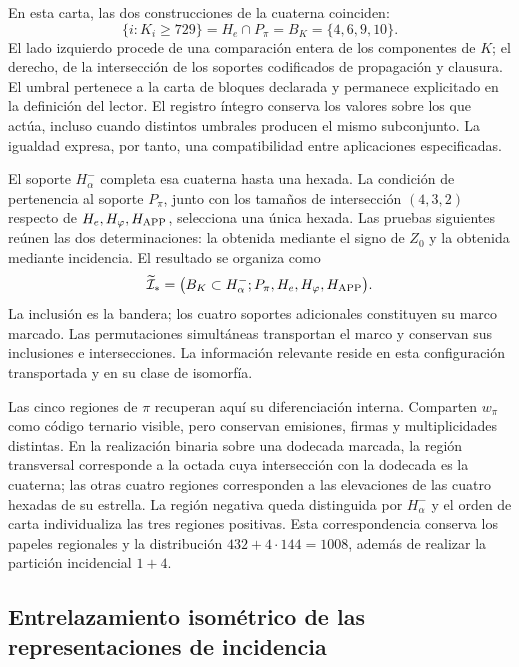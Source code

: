 En esta carta, las dos construcciones de la cuaterna coinciden:
\begin{equation}
 \{i:K_i\geq729\}
 =H_e\cap P_\pi=B_K=\{4,6,9,10\}.
 \label{x_reciprocidad:inc-ampl-cuaterna}
\end{equation}
El lado izquierdo procede de una comparación entera de los componentes
de $K$; el derecho, de la intersección de los soportes codificados de
propagación y clausura. El umbral pertenece a la carta de bloques
declarada y permanece explicitado en la definición del lector. El
registro íntegro conserva los valores sobre los que actúa, incluso cuando
distintos umbrales producen el mismo subconjunto. La igualdad expresa,
por tanto, una compatibilidad entre aplicaciones especificadas.

El soporte $H^-_\alpha$ completa esa cuaterna hasta una hexada. La
condición de pertenencia al soporte $P_\pi$, junto con los tamaños de
intersección $(4,3,2)$ respecto de $H_e,H_\varphi,H_{\rm APP}$,
selecciona una única hexada. Las pruebas siguientes reúnen las dos
determinaciones: la obtenida mediante el signo de $Z_0$ y la obtenida
mediante incidencia. El resultado se organiza como
\begin{equation}
 \widetilde{\mathcal I}_*
 =\bigl(B_K\subset H^-_\alpha;
         P_\pi,H_e,H_\varphi,H_{\rm APP}\bigr).
 \label{x_reciprocidad:inc-ampl-marco}
\end{equation}
La inclusión es la bandera; los cuatro soportes adicionales constituyen
su marco marcado. Las permutaciones simultáneas transportan el marco y
conservan sus inclusiones e intersecciones. La información relevante reside
en esta configuración transportada y en su clase de isomorfía.

Las cinco regiones de $\pi$ recuperan aquí su diferenciación interna.
Comparten $w_\pi$ como código ternario visible, pero conservan emisiones,
firmas y multiplicidades distintas. En la realización binaria sobre una
dodecada marcada, la región transversal corresponde a la octada cuya
intersección con la dodecada es la cuaterna; las otras cuatro regiones
corresponden a las elevaciones de las cuatro hexadas de su estrella. La
región negativa queda distinguida por $H^-_\alpha$ y el orden de carta
individualiza las tres regiones positivas. Esta correspondencia conserva
los papeles regionales y la distribución $432+4\cdot144=1008$, además
de realizar la partición incidencial $1+4$.



\subsection{Entrelazamiento isométrico de las representaciones de incidencia}
\label{x_reciprocidad:exc:entrelazador}

